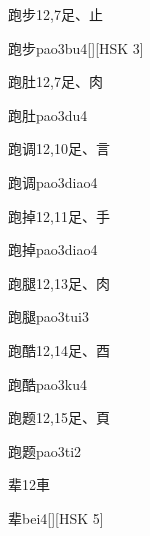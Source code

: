 \begin{entry}{跑步}{12,7}{⾜、⽌}
  \begin{phonetics}{跑步}{pao3bu4}[][HSK 3]
  \end{phonetics}
\end{entry}

\begin{entry}{跑肚}{12,7}{⾜、⾁}
  \begin{phonetics}{跑肚}{pao3du4}
  \end{phonetics}
\end{entry}

\begin{entry}{跑调}{12,10}{⾜、⾔}
  \begin{phonetics}{跑调}{pao3diao4}
  \end{phonetics}
\end{entry}

\begin{entry}{跑掉}{12,11}{⾜、⼿}
  \begin{phonetics}{跑掉}{pao3diao4}
  \end{phonetics}
\end{entry}

\begin{entry}{跑腿}{12,13}{⾜、⾁}
  \begin{phonetics}{跑腿}{pao3tui3}
  \end{phonetics}
\end{entry}

\begin{entry}{跑酷}{12,14}{⾜、⾣}
  \begin{phonetics}{跑酷}{pao3ku4}
  \end{phonetics}
\end{entry}

\begin{entry}{跑题}{12,15}{⾜、⾴}
  \begin{phonetics}{跑题}{pao3ti2}
  \end{phonetics}
\end{entry}

\begin{entry}{辈}{12}{⾞}
  \begin{phonetics}{辈}{bei4}[][HSK 5]
  \end{phonetics}
\end{entry}


